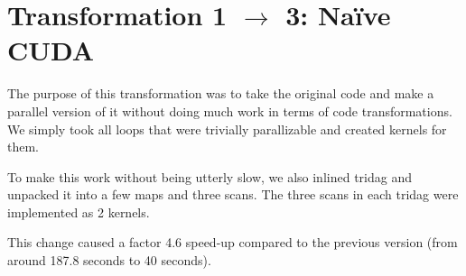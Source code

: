 \section{Transformation 1 $\rightarrow$ 3: Naïve CUDA}

The purpose of this transformation was to take the original code and
make a parallel version of it without doing much work in terms of code
transformations. We simply took all loops that were trivially
parallizable and created kernels for them.

To make this work without being utterly slow, we also inlined tridag
and unpacked it into a few maps and three scans. The three scans in
each tridag were implemented as 2 kernels.

This change caused a factor 4.6 speed-up compared to the previous version
(from around 187.8 seconds to 40 seconds).
